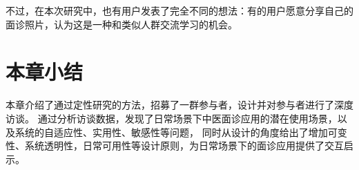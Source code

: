 不过，在本次研究中，也有用户发表了完全不同的想法：有的用户愿意分享自己的面诊照片，认为这是一种和类似人群交流学习的机会。

\section{本章小结}


本章介绍了通过定性研究的方法，招募了一群参与者，设计并对参与者进行了深度访谈。
通过分析访谈数据，发现了日常场景下中医面诊应用的潜在使用场景，以及系统的自适应性、实用性、敏感性等问题，
同时从设计的角度给出了增加可变性、系统透明性，日常可用性等设计原则，为日常场景下的面诊应用提供了交互启示。











